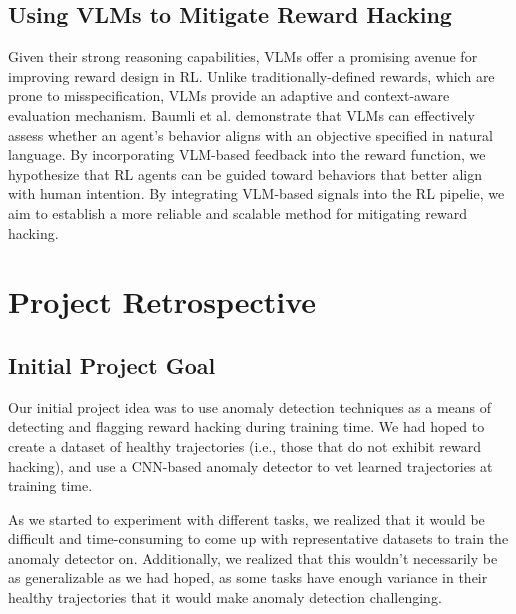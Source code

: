 \documentclass{article}
\begin{document}
\subsection{Using VLMs to Mitigate Reward Hacking}
Given their strong reasoning capabilities, VLMs offer a promising avenue for improving reward design in RL. Unlike traditionally-defined rewards, which are prone to misspecification, VLMs provide an adaptive and context-aware evaluation mechanism. Baumli et al. demonstrate that VLMs can effectively assess whether an agent's behavior aligns with an objective specified in natural language. By incorporating VLM-based feedback into the reward function, we hypothesize that RL agents can be guided toward behaviors that better align with human intention. By integrating VLM-based signals into the RL pipelie, we aim to establish a more reliable and scalable method for mitigating reward hacking. 


\section{Project Retrospective}
\subsection{Initial Project Goal}
Our initial project idea was to use anomaly detection techniques as a means of detecting and flagging reward hacking during training time. We had hoped to create a dataset of healthy trajectories (i.e., those that do not exhibit reward hacking), and use a CNN-based anomaly detector to vet learned trajectories at training time. 

As we started to experiment with different tasks, we realized that it would be difficult and time-consuming to come up with representative datasets to train the anomaly detector on. Additionally, we realized that this wouldn't necessarily be as generalizable as we had hoped, as some tasks have enough variance in their healthy trajectories that it would make anomaly detection challenging. 
\end{document}
